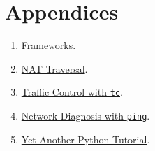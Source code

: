 \section*{Appendices}
\begin{enumerate}
\item \href{https://tecnologias-multimedia.github.io/contents/frameworks/}{Frameworks}.
\item \href{https://tecnologias-multimedia.github.io/contents/NAT_traversal/}{NAT Traversal}.
\item \href{https://vicente-gonzalez-ruiz.github.io/about_tc/}{Traffic Control with \texttt{tc}}.
\item \href{https://vicente-gonzalez-ruiz.github.io/about_ping/}{Network Diagnosis with \texttt{ping}}.
\item \href{https://github.com/vicente-gonzalez-ruiz/YAPT}{Yet Another Python Tutorial}.
\end{enumerate}


%
